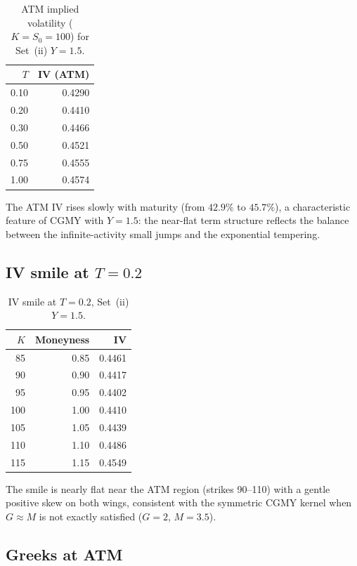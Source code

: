 \documentclass[11pt,a4paper]{article}
\begin{document}
\begin{table}[ht]
\centering
\caption{ATM implied volatility ($K=S_0=100$) for Set~(ii) $Y=1.5$.}
\label{tab:atm_iv}
\begin{tabular}{rr}
\toprule
$T$ & IV (ATM) \\
\midrule
0.10 & 0.4290 \\
0.20 & 0.4410 \\
0.30 & 0.4466 \\
0.50 & 0.4521 \\
0.75 & 0.4555 \\
1.00 & 0.4574 \\
\bottomrule
\end{tabular}
\end{table}

The ATM IV rises slowly with maturity (from $42.9\%$ to $45.7\%$), a
characteristic feature of CGMY with $Y=1.5$: the near-flat term structure
reflects the balance between the infinite-activity small jumps and the
exponential tempering.

\subsection{IV smile at $T = 0.2$}

\begin{table}[ht]
\centering
\caption{IV smile at $T=0.2$, Set~(ii) $Y=1.5$.}
\label{tab:smile}
\begin{tabular}{rrr}
\toprule
$K$ & Moneyness & IV \\
\midrule
 85 & 0.85 & 0.4461 \\
 90 & 0.90 & 0.4417 \\
 95 & 0.95 & 0.4402 \\
100 & 1.00 & 0.4410 \\
105 & 1.05 & 0.4439 \\
110 & 1.10 & 0.4486 \\
115 & 1.15 & 0.4549 \\
\bottomrule
\end{tabular}
\end{table}

The smile is nearly flat near the ATM region (strikes 90--110) with a gentle
positive skew on both wings, consistent with the symmetric CGMY kernel when
$G\approx M$ is not exactly satisfied ($G=2$, $M=3.5$).

\subsection{Greeks at ATM}
\end{document}
